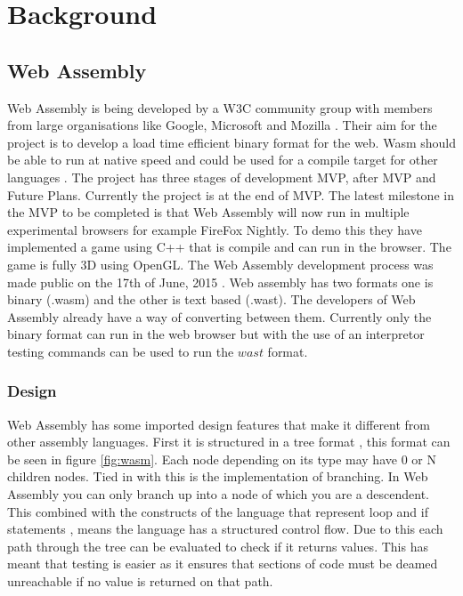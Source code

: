 \chapter{Background}\label{C:bg}


\section{Web Assembly}


Web Assembly is being developed by a W3C community group with members from large organisations like Google, Microsoft and Mozilla \cite{8_wagner_2016}. Their aim for the project is to develop a load time efficient binary format for the web. Wasm should be able to run at native speed and could be used for a compile target for other languages \cite{8_wagner_2016}. The project has three stages of development MVP, after MVP and Future Plans. Currently the project is  at the end of MVP. The latest milestone in the MVP to be completed is that Web Assembly will now run in multiple experimental browsers \cite{8_wagner_2016}\cite{7_zhu_2016} for example FireFox Nightly. To demo this they have implemented a game using C++ that is compile and can run in the browser. The game is fully 3D using OpenGL. The Web Assembly development process was made public on the 17th of June, 2015 \cite{6_bastien_2016}. Web assembly has two formats one is binary (.wasm) and the other is text based (.wast). The developers of Web Assembly already have a way of converting between them. Currently only the binary format can run in the web browser but with the use of an interpretor testing commands can be used to run the $wast$ format. 

\subsection{Design}\label{subsec:wad}

Web Assembly has some imported design features that make it different from other assembly languages. First it is structured in a tree format \cite{10_gohman_bastien_wagner_2016}, this format can be seen in figure \ref{fig:wasm}. Each node depending on its type may have 0 or N children nodes. Tied in with this is the implementation of branching. In Web Assembly you can only branch up into a node of which you are a descendent. This combined with the constructs of the language that represent loop and if statements \cite{11_webassembly/spec_2016}, means the language has a structured control flow. Due to this each path through the tree can be evaluated to check if it returns values. This has meant that testing is easier as it ensures that sections of code must be deamed unreachable if no value is returned on that path. 

